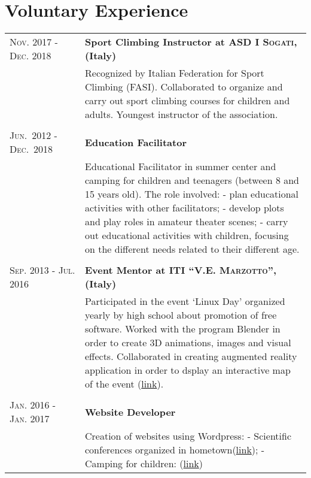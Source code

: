 \documentclass[a4paper,10pt]{article}
\begin{document}
\section{Voluntary Experience}
\begin{tabular}{m{0.25\linewidth}|p{0.75\linewidth}}
  \textsc{Nov. 2017 - Dec. 2018} &\textbf{Sport Climbing Instructor at \textsc{ASD I Sogati}, (Italy)}\\
  &  Recognized by Italian Federation for Sport Climbing (FASI). Collaborated to organize and carry out sport climbing courses for children and adults. Youngest instructor of the association.\\

   \\

  \textsc{Jun.~2012 - Dec.~2018} &
  \textbf{Education Facilitator} \\
  & Educational Facilitator in summer center and camping for children and teenagers (between 8 and 15 years old). The role involved: - plan educational activities with other facilitators; - develop plots and play roles in amateur theater scenes; - carry out educational activities with children, focusing on the different needs related to their different age.\\

   \\
  
  \textsc{Sep. 2013 - Jul. 2016} &
  \textbf{Event Mentor at \textsc{ITI “V.E. Marzotto”}, (Italy)}\\
  & Participated in the event `Linux Day' organized yearly by high school about promotion of free software. Worked with the program Blender in order to create 3D animations, images and visual effects. Collaborated in creating augmented reality application in order to dsplay an interactive map of the event (\href{https://play.google.com/store/apps/details?id=it.itismarzotto.armaps&hl=it}{link}).\\
  
   \\

  \textsc{Jan. 2016 - Jan. 2017}& \textbf{Website Developer} \\
  & Creation of websites using Wordpress:
  - Scientific conferences organized in hometown(\href{http://laviadellescienze.altervista.org/}{link}); - Camping for children: (\href{http://campomaglio.altervista.org/}{link})\\
\end{tabular}
\end{document}
